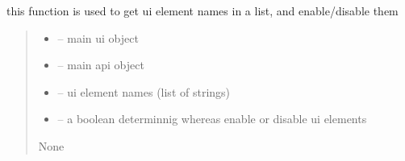 \documentclass[letterpaper,10pt,english]{sphinxmanual}
\begin{document}
\begin{savenotes}\begin{fulllineitems}
\label{\detokenize{setting/backend/camera_funcs:oxin.backend.camera_funcs.set_widjets_enable_or_disable}}
\pysigstartsignatures
{}
\pysigstopsignatures
\sphinxAtStartPar
this function is used to get ui element names in a list, and enable/disable them
\begin{quote}\begin{description}
\begin{itemize}
\item {} 
\sphinxAtStartPar
{} – main ui object

\item {} 
\sphinxAtStartPar
{} – main api object

\item {} 
\sphinxAtStartPar
{} – ui element names (list of strings)

\item {} 
\sphinxAtStartPar
{} – a boolean determinnig whereas enable or disable ui elements

\end{itemize}

\sphinxAtStartPar
None

\end{description}\end{quote}

\end{fulllineitems}\end{savenotes}

\end{document}
